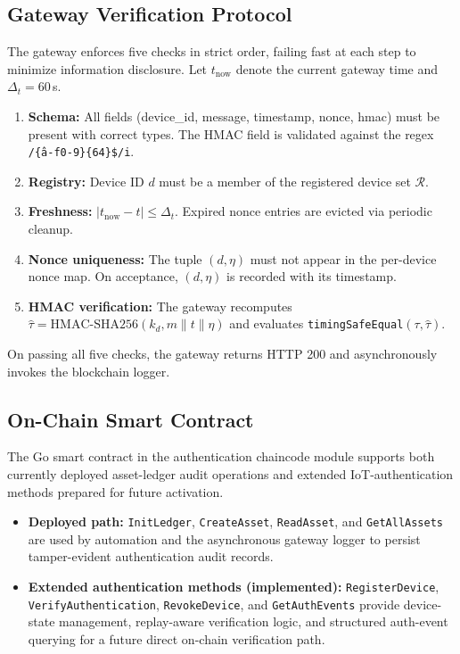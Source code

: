\documentclass[conference]{IEEEtran}
\begin{document}
\subsection{Gateway Verification Protocol}

The gateway enforces five checks in strict order, failing fast at each step to minimize information disclosure. Let $t_{\text{now}}$ denote the current gateway time and $\Delta_t = 60$\,s.

\begin{enumerate}
\item \textbf{Schema:} All fields (device\_id, message, timestamp, nonce, hmac) must be present with correct types. The HMAC field is validated against the regex \texttt{/\^\{a-f0-9\}\{64\}\$/i}.

\item \textbf{Registry:} Device ID $d$ must be a member of the registered device set $\mathcal{R}$.

\item \textbf{Freshness:} $|t_{\text{now}} - t| \leq \Delta_t$. Expired nonce entries are evicted via periodic cleanup.

\item \textbf{Nonce uniqueness:} The tuple $(d,\eta)$ must not appear in the per-device nonce map. On acceptance, $(d,\eta)$ is recorded with its timestamp.

\item \textbf{HMAC verification:} The gateway recomputes $\hat{\tau}=\text{HMAC-SHA256}(k_d,m\|t\|\eta)$ and evaluates \texttt{timingSafeEqual}$(\tau,\hat{\tau})$.
\end{enumerate}

On passing all five checks, the gateway returns HTTP 200 and asynchronously invokes the blockchain logger.

\subsection{On-Chain Smart Contract}

The Go smart contract in the authentication chaincode module supports both currently deployed asset-ledger audit operations and extended IoT-authentication methods prepared for future activation.

\begin{itemize}
\item \textbf{Deployed path:} \texttt{InitLedger}, \texttt{CreateAsset}, \texttt{ReadAsset}, and \texttt{GetAllAssets} are used by automation and the asynchronous gateway logger to persist tamper-evident authentication audit records.

\item \textbf{Extended authentication methods (implemented):} \texttt{RegisterDevice}, \texttt{VerifyAuthentication}, \texttt{RevokeDevice}, and \texttt{GetAuthEvents} provide device-state management, replay-aware verification logic, and structured auth-event querying for a future direct on-chain verification path.
\end{itemize}
\end{document}

